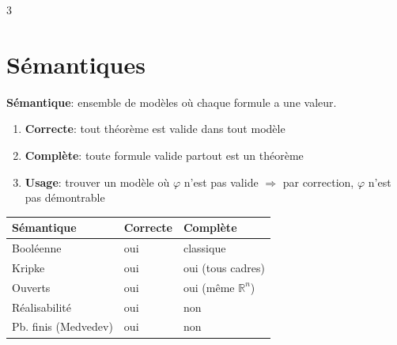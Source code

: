 \documentclass[12pt, a4paper]{article}
\providecommand{\R}{\mathbb{R}}
\begin{document}
\begin{multicols*}{3}
	\section{Sémantiques}
	\textbf{Sémantique}: ensemble de modèles où chaque formule a une valeur.
	\begin{enumerate}[\roman*.]
		\item \textbf{Correcte}: tout théorème est valide dans tout modèle
		\item \textbf{Complète}: toute formule valide partout est un théorème
		\item \textbf{Usage}: trouver un modèle où $\varphi$ n'est pas valide $\Rightarrow$ par correction, $\varphi$ n'est pas démontrable
	\end{enumerate}
	\begin{tabular}{|l|l|l|}
		\hline
		\textbf{Sémantique} & \textbf{Correcte} & \textbf{Complète} \\
		\hline
		Booléenne       & oui              & classique \\
		Kripke          & oui              & oui (tous cadres)  \\
		Ouverts         & oui              & oui (même $\R^n$)  \\
		Réalisabilité   & oui              & non                \\
		Pb. finis (Medvedev) & oui         & non                \\
		\hline
	\end{tabular}


\end{multicols*}
\end{document}
